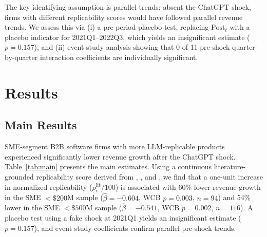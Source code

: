 \documentclass[12pt,a4paper]{article}
\begin{document}
The key identifying assumption is parallel trends: absent the ChatGPT shock, firms with different replicability scores would have followed parallel revenue trends. We assess this via (i) a pre-period placebo test, replacing $\text{Post}_t$ with a placebo indicator for 2021Q1--2022Q3, which yields an insignificant estimate ($p = 0.157$), and (ii) event study analysis showing that 0 of 11 pre-shock quarter-by-quarter interaction coefficients are individually significant.

\section{Results}
\label{sec:results}

\subsection{Main Results}

SME-segment B2B software firms with more LLM-replicable products experienced significantly lower revenue growth after the ChatGPT shock. Table~\ref{tab:main} presents the main estimates. Using a continuous literature-grounded replicability score derived from \citet{eloundou2024}, \citet{acemoglu2022}, and \citet{brynjolfsson2023}, we find that a one-unit increase in normalized replicability ($\rho_i^{\text{lit}} / 100$) is associated with 60\% lower revenue growth in the SME $<\$200$M sample ($\hat{\beta} = -0.604$, WCB $p = 0.003$, $n=94$) and 54\% lower in the SME $<\$500$M sample ($\hat{\beta} = -0.541$, WCB $p = 0.002$, $n=116$). A placebo test using a fake shock at 2021Q1 yields an insignificant estimate ($p = 0.157$), and event study coefficients confirm parallel pre-shock trends.
\end{document}
